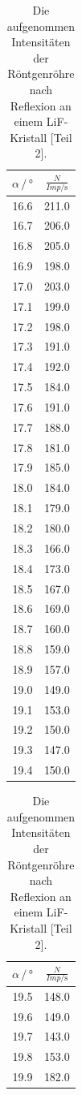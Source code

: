 \begin{table}
  \centering
  \caption{Die aufgenommen Intensitäten der Röntgenröhre nach Reflexion an einem LiF-Kristall [Teil 2].}
  \begin{tabular}[t]{cc}
  \toprule
  $\alpha \,/\, \si{\degree} $ & $\frac{N}{Imp/\si{\second}}$ \\
  \midrule
  16.6 & 211.0  \\
  16.7 & 206.0  \\
  16.8 & 205.0  \\
  16.9 & 198.0  \\
  17.0 & 203.0  \\
  17.1 & 199.0  \\
  17.2 & 198.0  \\
  17.3 & 191.0  \\
  17.4 & 192.0  \\
  17.5 & 184.0  \\
  17.6 & 191.0  \\
  17.7 & 188.0  \\
  17.8 & 181.0  \\
  17.9 & 185.0  \\
  18.0 & 184.0  \\
  18.1 & 179.0  \\
  18.2 & 180.0  \\
  18.3 & 166.0  \\
  18.4 & 173.0  \\
  18.5 & 167.0  \\
  18.6 & 169.0  \\
  18.7 & 160.0  \\
  18.8 & 159.0  \\
  18.9 & 157.0  \\
  19.0 & 149.0  \\
  19.1 & 153.0  \\
  19.2 & 150.0  \\
  19.3 & 147.0  \\
  19.4 & 150.0\\
  \bottomrule
  \end{tabular}
  \begin{tabular}[t]{cc}
  \toprule
  $\alpha \,/\, \si{\degree} $ & $\frac{N}{Imp/\si{\second}}$ \\
  \midrule
  19.5 & 148.0\\
  19.6 & 149.0\\
  19.7 & 143.0\\
  19.8 & 153.0\\
  19.9 & 182.0\\

\end{tabular}
\end{table}
